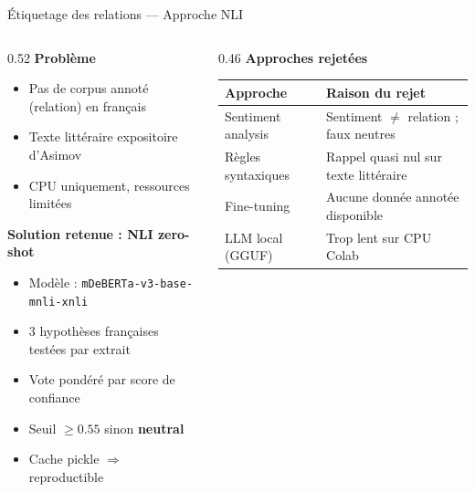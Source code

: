 \documentclass[aspectratio=169]{beamer}
\begin{document}
\begin{frame}{Étiquetage des relations --- Approche NLI}
  \begin{columns}[T]
    \begin{column}{0.52\textwidth}
      \textbf{Problème}
      \begin{itemize}
        \item Pas de corpus annoté (relation) en français
        \item Texte littéraire expositoire d'Asimov
        \item CPU uniquement, ressources limitées
      \end{itemize}
      \vspace{6pt}
      \textbf{Solution retenue : NLI zero-shot}
      \begin{itemize}
        \item Modèle : \texttt{mDeBERTa-v3-base-mnli-xnli}
        \item 3 hypothèses françaises testées par extrait
        \item Vote pondéré par score de confiance
        \item Seuil $\geq 0.55$ sinon \textcolor{neutral}{\textbf{neutral}}
        \item Cache pickle $\Rightarrow$ reproductible
      \end{itemize}
    \end{column}
    \begin{column}{0.46\textwidth}
      \textbf{Approches rejetées}\\[4pt]
      \footnotesize
      \setlength{\tabcolsep}{3pt}
      \renewcommand{\arraystretch}{1.2}
      \begin{tabular}{p{2.5cm} p{3.5cm}}
        \toprule
        \textbf{Approche} & \textbf{Raison du rejet} \\
        \midrule
        Sentiment analysis & Sentiment $\neq$ relation ; faux neutres \\
        Règles syntaxiques & Rappel quasi nul sur texte littéraire \\
        Fine-tuning & Aucune donnée annotée disponible \\
        LLM local (GGUF) & Trop lent sur CPU Colab \\
        \bottomrule
      \end{tabular}
    \end{column}
  \end{columns}
\end{frame}
\end{document}
